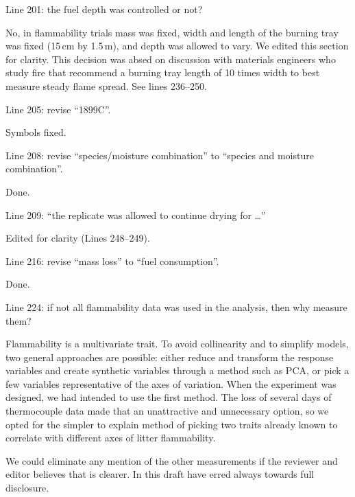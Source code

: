 \documentclass[letterpaper, 12pt]{letter}
\begin{document}
\begin{letter}{}
\begin{quoting}
  Line 201: the fuel depth was controlled or not?
\end{quoting}

No, in flammability trials mass was fixed, width and length of the burning tray
was fixed (15\,cm by 1.5\,m), and depth was allowed to vary. We edited this
section for clarity. This decision was absed on discussion with materials
engineers who study fire that recommend a burning tray length of 10 times width
to best measure steady flame spread. See lines 236--250.

\begin{quoting}
Line 205: revise “1899C”.
\end{quoting}

Symbols fixed.

\begin{quoting}
  Line 208: revise “species/moisture combination” to “species and moisture
  combination”.
\end{quoting}

Done.

\begin{quoting}
  Line 209: “the replicate was allowed to continue drying for …”
\end{quoting}

Edited for clarity (Lines 248--249).

\begin{quoting}
  Line 216: revise “mass loss” to “fuel consumption”.
\end{quoting}

Done.

\begin{quoting}
  Line 224: if not all flammability data was used in the analysis, then why
  measure them?
\end{quoting}

Flammability is a multivariate trait. To avoid collinearity and to simplify
models, two general approaches are possible: either reduce and transform the
response variables and create synthetic variables through a method such as PCA,
or pick a few variables representative of the axes of variation. When the
experiment was designed, we had intended to use the first method. The loss of
several days of thermocouple data made that an unattractive and unnecessary
option, so we opted for the simpler to explain method of picking two traits
already known to correlate with different axes of litter flammability.

We could eliminate any mention of the other measurements if the reviewer and
editor believes that is clearer. In this draft have erred always towards full
disclosure.


\end{letter}
\end{document}
